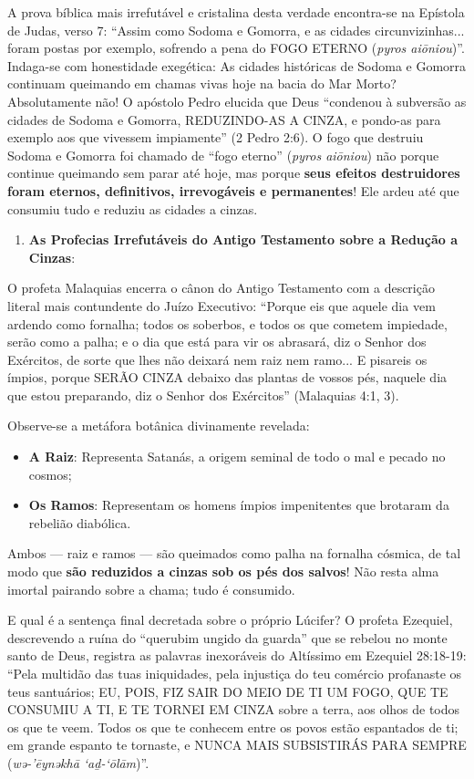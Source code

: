 A prova bíblica mais irrefutável e cristalina desta verdade encontra-se na Epístola de Judas, verso 7:
``Assim como Sodoma e Gomorra, e as cidades circunvizinhas... foram postas por exemplo, sofrendo a pena do FOGO ETERNO (\textit{pyros aiōniou})''.
Indaga-se com honestidade exegética: As cidades históricas de Sodoma e Gomorra continuam queimando em chamas vivas hoje na bacia do Mar Morto? Absolutamente não! O apóstolo Pedro elucida que Deus ``condenou à subversão as cidades de Sodoma e Gomorra, REDUZINDO-AS A CINZA, e pondo-as para exemplo aos que vivessem impiamente'' (2 Pedro 2:6).
O fogo que destruiu Sodoma e Gomorra foi chamado de ``fogo eterno'' (\textit{pyros aiōniou}) não porque continue queimando sem parar até hoje, mas porque \textbf{seus efeitos destruidores foram eternos, definitivos, irrevogáveis e permanentes}! Ele ardeu até que consumiu tudo e reduziu as cidades a cinzas.

\begin{enumerate}
  \item \textbf{As Profecias Irrefutáveis do Antigo Testamento sobre a Redução a Cinzas}:
\end{enumerate}

O profeta Malaquias encerra o cânon do Antigo Testamento com a descrição literal mais contundente do Juízo Executivo:
``Porque eis que aquele dia vem ardendo como fornalha; todos os soberbos, e todos os que cometem impiedade, serão como a palha; e o dia que está para vir os abrasará, diz o Senhor dos Exércitos, de sorte que lhes não deixará nem raiz nem ramo... E pisareis os ímpios, porque SERÃO CINZA debaixo das plantas de vossos pés, naquele dia que estou preparando, diz o Senhor dos Exércitos'' (Malaquias 4:1, 3).

Observe-se a metáfora botânica divinamente revelada:
\begin{itemize}
  \item \textbf{A Raiz}: Representa Satanás, a origem seminal de todo o mal e pecado no cosmos;
  \item \textbf{Os Ramos}: Representam os homens ímpios impenitentes que brotaram da rebelião diabólica.
\end{itemize}

Ambos — raiz e ramos — são queimados como palha na fornalha cósmica, de tal modo que \textbf{são reduzidos a cinzas sob os pés dos salvos}! Não resta alma imortal pairando sobre a chama; tudo é consumido.

E qual é a sentença final decretada sobre o próprio Lúcifer? O profeta Ezequiel, descrevendo a ruína do ``querubim ungido da guarda'' que se rebelou no monte santo de Deus, registra as palavras inexoráveis do Altíssimo em Ezequiel 28:18-19:
``Pela multidão das tuas iniquidades, pela injustiça do teu comércio profanaste os teus santuários; EU, POIS, FIZ SAIR DO MEIO DE TI UM FOGO, QUE TE CONSUMIU A TI, E TE TORNEI EM CINZA sobre a terra, aos olhos de todos os que te veem. Todos os que te conhecem entre os povos estão espantados de ti; em grande espanto te tornaste, e NUNCA MAIS SUBSISTIRÁS PARA SEMPRE (\textit{wə-’ēynəkhā ‘aḏ-‘ōlām})''.

